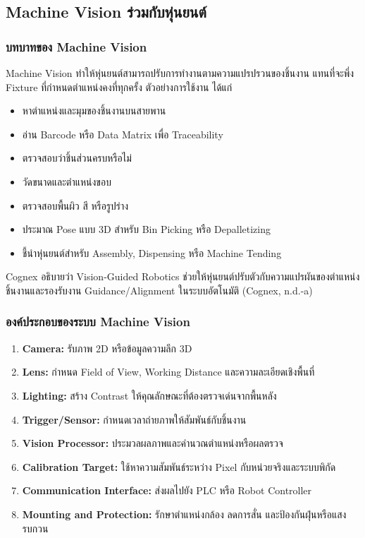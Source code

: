 \subsection{Machine Vision ร่วมกับหุ่นยนต์}

\subsubsection{บทบาทของ Machine Vision}

Machine Vision ทำให้หุ่นยนต์สามารถปรับการทำงานตามความแปรปรวนของชิ้นงาน แทนที่จะพึ่ง Fixture ที่กำหนดตำแหน่งคงที่ทุกครั้ง ตัวอย่างการใช้งาน ได้แก่

\begin{itemize}
    \item หาตำแหน่งและมุมของชิ้นงานบนสายพาน
    \item อ่าน Barcode หรือ Data Matrix เพื่อ Traceability
    \item ตรวจสอบว่าชิ้นส่วนครบหรือไม่
    \item วัดขนาดและตำแหน่งขอบ
    \item ตรวจสอบพื้นผิว สี หรือรูปร่าง
    \item ประมาณ Pose แบบ 3D สำหรับ Bin Picking หรือ Depalletizing
    \item ชี้นำหุ่นยนต์สำหรับ Assembly, Dispensing หรือ Machine Tending
\end{itemize}

Cognex อธิบายว่า Vision-Guided Robotics ช่วยให้หุ่นยนต์ปรับตัวกับความแปรผันของตำแหน่งชิ้นงานและรองรับงาน Guidance/Alignment ในระบบอัตโนมัติ (Cognex, n.d.-a)

\subsubsection{องค์ประกอบของระบบ Machine Vision}

\begin{enumerate}
    \item \textbf{Camera:} รับภาพ 2D หรือข้อมูลความลึก 3D
    \item \textbf{Lens:} กำหนด Field of View, Working Distance และความละเอียดเชิงพื้นที่
    \item \textbf{Lighting:} สร้าง Contrast ให้คุณลักษณะที่ต้องตรวจเด่นจากพื้นหลัง
    \item \textbf{Trigger/Sensor:} กำหนดเวลาถ่ายภาพให้สัมพันธ์กับชิ้นงาน
    \item \textbf{Vision Processor:} ประมวลผลภาพและคำนวณตำแหน่งหรือผลตรวจ
    \item \textbf{Calibration Target:} ใช้หาความสัมพันธ์ระหว่าง Pixel กับหน่วยจริงและระบบพิกัด
    \item \textbf{Communication Interface:} ส่งผลไปยัง PLC หรือ Robot Controller
    \item \textbf{Mounting and Protection:} รักษาตำแหน่งกล้อง ลดการสั่น และป้องกันฝุ่นหรือแสงรบกวน
\end{enumerate}

